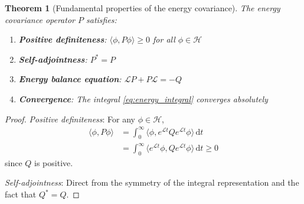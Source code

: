 \documentclass[a4paper,12pt]{article}
\newtheorem{theorem}{Theorem}[section]
\newcommand{\dd}{\,\mathrm{d}}
\def\H{\mathcal{H}}
\newcommand{\inner}[2]{\langle #1, #2 \rangle}
\begin{document}
\begin{theorem}[Fundamental properties of the energy covariance]\label{thm:covariance_properties}
The energy covariance operator $P$ satisfies:
\begin{enumerate}
\item \textbf{Positive definiteness}: $\inner{\phi}{P\phi} \geq 0$ for all $\phi \in \H$
\item \textbf{Self-adjointness}: $P^* = P$
\item \textbf{Energy balance equation}: $\mathcal{L}P + P\mathcal{L} = -Q$
\item \textbf{Convergence}: The integral \eqref{eq:energy_integral} converges absolutely
\end{enumerate}
\end{theorem}

\begin{proof}
\textit{Positive definiteness}: For any $\phi \in \H$,
\begin{align}
\inner{\phi}{P\phi} &= \int_0^{\infty} \inner{\phi}{e^{\mathcal{L}t} Q e^{\mathcal{L}t} \phi} \dd t\\
&= \int_0^{\infty} \inner{e^{\mathcal{L}t}\phi}{Q e^{\mathcal{L}t}\phi} \dd t \geq 0
\end{align}
since $Q$ is positive.

\textit{Self-adjointness}: Direct from the symmetry of the integral representation and the fact that $Q^* = Q$.


\end{proof}
\end{document}
